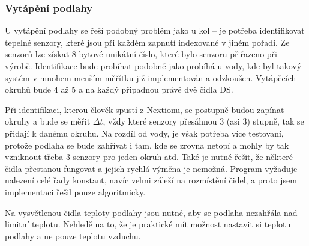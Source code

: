 \documentclass[a4paper,oneside,12pt]{report}
\let\openright=\clearpage
\begin{document}
\subsection{Vytápění podlahy}

U vytápění podlahy se řeší podobný problém jako u kol -- je potřeba identifikovat tepelné senzory, které jsou při každém zapnutí indexované v jiném pořadí.
Ze senzorů lze získat 8 bytové unikátní číslo, které bylo senzoru přiřazeno při výrobě.
Identifikace bude probíhat podobně jako probíhá u vody, kde byl takový systém v mnohem menším měřítku již implementován a odzkoušen.
Vytápěcích okruhů bude 4 až 5 a na každý připadnou právě dvě čidla DS.

Při identifikaci, kterou člověk spustí z Nextionu, se postupně budou zapínat okruhy a bude se měřit $\Delta t$, vždy které senzory přesáhnou 3 (asi 3) stupně, tak se přidají k danému okruhu.
Na rozdíl od vody, je však potřeba více testovaní, protože podlaha se bude zahřívat i tam, kde se zrovna netopí a mohly by tak vzniknout třeba 3 senzory pro jeden okruh atd.
Také je nutné řešit, že některé čidla přestanou fungovat a jejich rychlá výměna je nemožná.
Program vyžaduje nalezení celé řady konstant, navíc velmi záleží na rozmístění čidel, a proto jsem implementaci řešil pouze algoritmicky.

Na vysvětlenou čidla teploty podlahy jsou nutné, aby se podlaha nezahřála nad limitní teplotu.
Nehledě na to, že je praktické mít možnost nastavit si teplotu podlahy a ne pouze teplotu vzduchu.



\chapter*{}
\setcounter{page}{6}




\listoffigures
\openright
\end{document}
